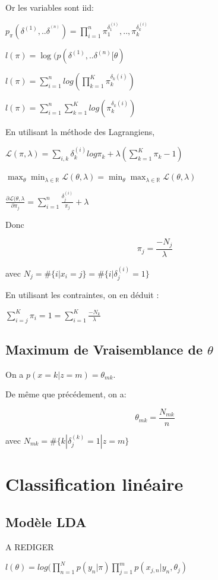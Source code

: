 \documentclass{article}
\begin{document}
Or les variables sont iid:

$p_\pi(\delta^{(1)}, .. \delta^{^(n)}) = \prod_{i=1}^n \pi_1^{\delta_1^{(i)}},
.., \pi_k^{\delta_k^{(i)}}$

$l(\pi) = \log(p(\delta^{(1)}, .. \delta^{(n)}[\theta)$

$l(\pi) = \sum_{i=1}^n log(\prod_{k=1}^K \pi_k^{\delta_k(i)})$

$l(\pi) = \sum_{i=1}^n \sum_{k=1}^K log(\pi_k^{\delta_k(i)})$

En utilisant la méthode des Lagrangiens,

$\mathcal{L}(\pi, \lambda) = \sum_{i, k} \delta_k^{(i)} log \pi_k +
\lambda(\sum_{k=1}^K \pi_k - 1)$

$\max_\theta \min_{\lambda \in \mathbb{R}} \mathcal{L}(\theta, \lambda) =
\min_\theta \max_{\lambda \in \mathbb{R}} \mathcal{L}(\theta, \lambda)$

$\frac{\partial \mathcal{L}(\theta, \lambda}{\partial \pi_j} = \sum_{i=1}^n
\frac{\delta_j^{(i)}}{\pi_j} + \lambda$

Donc

$$\pi_j = \frac{-N_j}{\lambda}$$

avec $N_j = \#\{ i | x_i = j \} = \#\{ i | \delta_j^{(i)} = 1 \}$

En utilisant les contraintes, on en déduit :

$\sum_{i=j}^K \pi_i = 1 = \sum_{i=1}^K \frac{- N_k}{\lambda}$

\subsection{Maximum de Vraisemblance de $\theta$}


On a $p(x=k|z=m)= \theta_{mk}$.

De même que précédement, on a:

$$\theta_{mk} = \frac{N_{mk}}{n}$$

avec $N_{mk} = \#\{k|\delta_j^{(k)} = 1 | z = m\}$

\section{Classification linéaire}

\subsection{Modèle LDA}
A REDIGER

$l(\theta) = log(\prod_{n=1}^N p (y_n | \pi) \prod_{j=1}^m p(x_{j, n}|y_n, \theta_j)$
\end{document}
